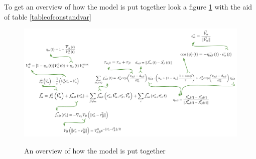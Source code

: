 To get an overview of how the model is put together look a figure \ref{overview}
with the aid of table \ref{tableofconstandvar}

\begin{figure}
    \centering
    {\includegraphics[scale=0.45]{Figures/overview.pdf}} 
    \caption{An overview of how the model is put together}
    \label{overview}
\end{figure}



 
